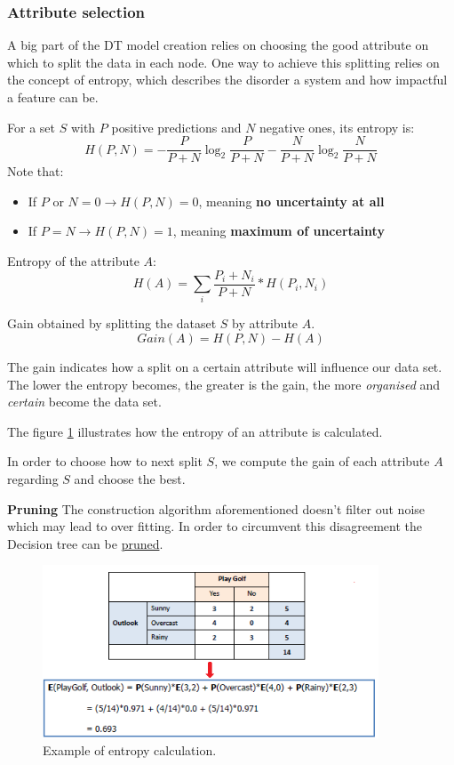 \subsubsection{Attribute selection}
\label{sec:selection}

A big part of the DT model creation relies on choosing the good attribute on which to split the data in each node. One way to achieve this splitting relies on the concept of entropy, which describes the disorder a system and how impactful a feature can be.

For a set $S$ with $P$ positive predictions and $N$ negative ones, its entropy is:
$$
 H(P,N)=-\frac{P}{P+N}\log_2\frac{P}{P+N}-\frac{N}{P+N}\log_2\frac{N}{P+N}
$$
Note that:
\begin{itemize}
 \item If $P \text{ or } N=0 \rightarrow H(P,N)=0$, meaning \textbf{no uncertainty at all}
 \item If $P=N \rightarrow H(P,N)=1$, meaning \textbf{maximum of uncertainty}
\end{itemize}

Entropy of the attribute $A$:
$$
H(A) = \sum_{i} \frac{P_i + N_i}{P + N} * H(P_i, N_i)
$$

Gain obtained by splitting the dataset $S$ by attribute $A$.
$$
Gain(A) = H(P, N) - H(A)
$$

The gain indicates how a split on a certain attribute will influence our data set. The lower the entropy becomes, the greater is the gain, the more \textit{organised} and \textit{certain} become the data set.

The figure \ref{pic:entropy} illustrates how the entropy of an attribute is calculated.

In order to choose how to next split $S$, we compute the gain of each attribute $A$ regarding $S$ and choose the best.

\textbf{Pruning} The construction algorithm aforementioned 	doesn't filter out noise which may lead to over fitting. In order to circumvent this disagreement the Decision tree can be \href{https://en.wikipedia.org/wiki/Pruning_(decision_trees)}{pruned}.


\begin{figure}[H]%
 \centering
 \includegraphics[width=10cm]{./img/07/entropy.png}
 \caption{\label{pic:entropy} Example of entropy calculation.}
\end{figure}






